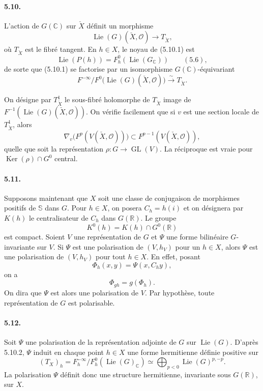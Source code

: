 \documentclass[10pt]{article}
\newcommand{\C}{\mathbb C}
\newcommand{\R}{\mathbb R}
\newcommand{\bS}{\mathbb S}
\newcommand{\cO}{\mathcal O}
\newcommand{\Ker}{\operatorname{Ker}}
\theoremstyle{deligne}
\newcommand{\Lie}{\operatorname{Lie}}
\newcommand{\GL}{\operatorname{GL}}
\begin{document}
\paragraph{5.10.}
L'action de $G(\C)$ sur $\check X$ définit un morphisme
\[
\tag{5.10.1}
  \Lie(G)(\check X,\cO)\longrightarrow T_{\check X},
\]
où $T_{\check X}$ est le fibré tangent. En $h\in X$, le noyau de (5.10.1) est
\[
  \Lie(P(h))=F_h^0(\Lie(G_\C)) \qquad (5.6),
\]
de sorte que (5.10.1) se factorise par un isomorphisme $G(\C)$-équivariant
\[
\tag{5.10.2}
  F^{-\infty}/F^0\bigl(\Lie(G)(\check X,\cO)\bigr)
  \xrightarrow{\sim} T_{\check X}.
\]

On désigne par $T^1_{\check X}$ le sous-fibré holomorphe de $T_{\check X}$ image de $F^{-1}(\Lie(G)(\check X,\cO))$. On vérifie facilement que si $v$ est une section locale de $T^1_{\check X}$, alors
\[
  \nabla_v\bigl(F^p(V(\check X,\cO))\bigr)
  \subset F^{p-1}(V(\check X,\cO)),
\]
quelle que soit la représentation $\rho:G\to\GL(V)$. La réciproque est vraie pour $\Ker(\rho)\cap G^0$ central.

\paragraph{5.11.}
Supposons maintenant que $X$ soit une classe de conjugaison de morphismes positifs de $\bS$ dans $G$. Pour $h\in X$, on posera $C_h=h(i)$ et on désignera par $K(h)$ le centralisateur de $C_h$ dans $G(\R)$. Le groupe
\[
  K^0(h)=K(h)\cap G^0(\R)
\]
est compact. Soient $V$ une représentation de $G$ et $\Psi$ une forme bilinéaire $G$-invariante sur $V$. Si $\Psi$ est une polarisation de $(V,h_V)$ pour un $h\in X$, alors $\Psi$ est une polarisation de $(V,h_V)$ pour tout $h\in X$. En effet, posant
\[
  \Phi_h(x,y)=\Psi(x,C_hy),
\]
on a
\[
\tag{5.11.1}
  \Phi_{gh}=g(\Phi_h).
\]
On dira que $\Psi$ est alors une polarisation de $V$. Par hypothèse, toute représentation de $G$ est polarisable.

\paragraph{5.12.}
Soit $\Psi$ une polarisation de la représentation adjointe de $G$ sur $\Lie(G)$. D'après 5.10.2, $\Psi$ induit en chaque point $h\in X$ une forme hermitienne définie positive sur
\[
\tag{5.12.1}
  (T_X)_h
  =
  F_h^{-\infty}/F_h^0(\Lie(G)_\C)
  \simeq
  \bigoplus_{p<0}\Lie(G)^{p,-p}.
\]
La polarisation $\Psi$ définit donc une structure hermitienne, invariante sous $G(\R)$, sur $X$.
\end{document}
